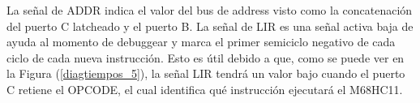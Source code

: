 La señal de ADDR indica el valor del bus de address visto como la concatenación del puerto C latcheado y el puerto B. La señal de LIR es una señal activa baja de ayuda al momento de debuggear y marca el primer semiciclo negativo de cada ciclo de cada nueva instrucción. Esto es útil debido a que, como se puede ver en la Figura (\ref{diagtiempos_5}), la señal LIR tendrá un valor bajo cuando el puerto C retiene el OPCODE, el cual identifica qué instrucción ejecutará el M68HC11.